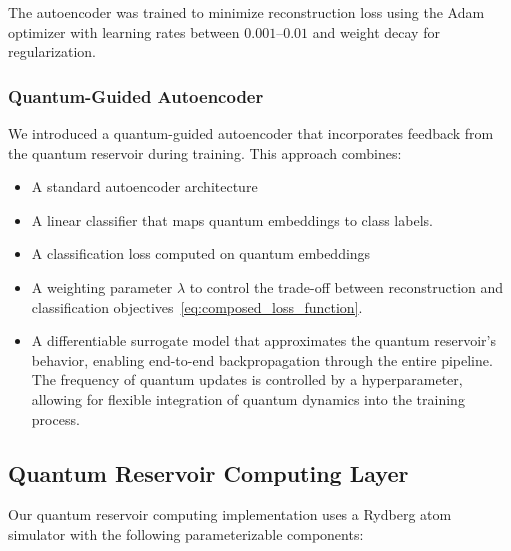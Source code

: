 \documentclass[conference]{IEEEtran}
\begin{document}
The autoencoder was trained to minimize reconstruction 
loss using the Adam optimizer with learning rates 
between $0.001$--$0.01$ and weight decay for regularization.

\subsubsection{Quantum-Guided Autoencoder}
We introduced a quantum-guided autoencoder 
that incorporates feedback from the quantum 
reservoir during training. This approach combines:

\begin{itemize}
    \item A standard autoencoder architecture
    \item A linear classifier that maps quantum embeddings to class labels.
    \item A classification loss computed on quantum embeddings
    \item A weighting parameter $\lambda$ to control the trade-off between 
    reconstruction and classification objectives~\ref{eq:composed_loss_function}.
    \item A differentiable surrogate model that approximates the quantum reservoir's behavior,
    enabling end-to-end backpropagation through the entire pipeline. The frequency 
    of quantum updates is controlled by a hyperparameter, allowing for
    flexible integration of quantum dynamics into the training process.
\end{itemize}


\subsection{Quantum Reservoir Computing Layer}
Our quantum reservoir computing implementation uses 
a Rydberg atom simulator with the following parameterizable
components:
\end{document}
